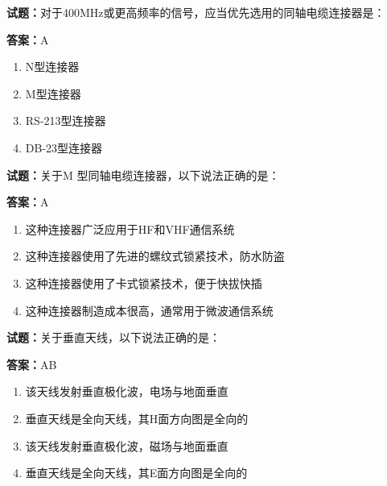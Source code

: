 \documentclass{ctexbook}
\begin{document}




\vspace{1em}

\textbf{试题：}对于400MHz或更高频率的信号，应当优先选用的同轴电缆连接器是： 

\textbf{答案：}A 

\begin{enumerate}[leftmargin=3em]
  \item N型连接器 

  \item M型连接器 

  \item RS-213型连接器 

  \item DB-23型连接器 

\end{enumerate}





\vspace{1em}

\textbf{试题：}关于M 型同轴电缆连接器，以下说法正确的是： 


\textbf{答案：}A 

\begin{enumerate}[leftmargin=3em]
  \item 这种连接器广泛应用于HF和VHF通信系统 

  \item 这种连接器使用了先进的螺纹式锁紧技术，防水防盗 

  \item 这种连接器使用了卡式锁紧技术，便于快拔快插 

  \item 这种连接器制造成本很高，通常用于微波通信系统 

\end{enumerate}





\vspace{1em}

\textbf{试题：}关于垂直天线，以下说法正确的是： 

\textbf{答案：}AB 

\begin{enumerate}[leftmargin=3em]
  \item 该天线发射垂直极化波，电场与地面垂直 

  \item 垂直天线是全向天线，其H面方向图是全向的 

  \item 该天线发射垂直极化波，磁场与地面垂直 

  \item 垂直天线是全向天线，其E面方向图是全向的 

\end{enumerate}
\end{document}

